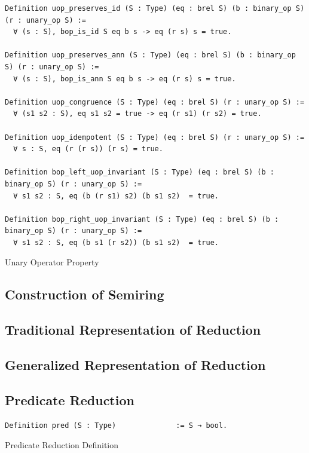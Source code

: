\documentclass[a4paper,12pt,twoside,openright]{report}
\begin{document}
\begin{listing}[H]
\begin{verbatim}
Definition uop_preserves_id (S : Type) (eq : brel S) (b : binary_op S) (r : unary_op S) :=
  ∀ (s : S), bop_is_id S eq b s -> eq (r s) s = true.
  
Definition uop_preserves_ann (S : Type) (eq : brel S) (b : binary_op S) (r : unary_op S) :=
  ∀ (s : S), bop_is_ann S eq b s -> eq (r s) s = true.

Definition uop_congruence (S : Type) (eq : brel S) (r : unary_op S) := 
  ∀ (s1 s2 : S), eq s1 s2 = true -> eq (r s1) (r s2) = true. 

Definition uop_idempotent (S : Type) (eq : brel S) (r : unary_op S) := 
  ∀ s : S, eq (r (r s)) (r s) = true.
  
Definition bop_left_uop_invariant (S : Type) (eq : brel S) (b : binary_op S) (r : unary_op S) :=
  ∀ s1 s2 : S, eq (b (r s1) s2) (b s1 s2)  = true.

Definition bop_right_uop_invariant (S : Type) (eq : brel S) (b : binary_op S) (r : unary_op S) :=
  ∀ s1 s2 : S, eq (b s1 (r s2)) (b s1 s2)  = true.
\end{verbatim}
\caption{Unary Operator Property} 
\label{coq:def:uop_properties}
\end{listing}

\subsection{Construction of Semiring}
\subsection{Traditional Representation of Reduction}
\subsection{Generalized Representation of Reduction}

\subsection{Predicate Reduction}


\begin{listing}[H]
\begin{verbatim}
Definition pred (S : Type)              := S → bool.
\end{verbatim}
\caption{Predicate Reduction Definition} 
\label{coq:def:predicate}
\end{listing}
\end{document}
